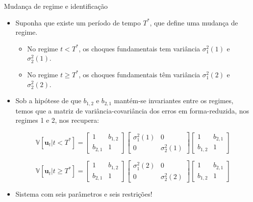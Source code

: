 \documentclass[11pt]{beamer}
\begin{document}
\begin{frame}{Mudança de regime e identificação}
	\begin{itemize}
		\item Suponha que existe um período de tempo $T^*$, que {\color{blue}define uma mudança de regime}.
		\begin{itemize}
				\item No regime $t < T^*$, os choques fundamentais tem variância $\sigma_{1}^2(1)$ e $\sigma_{2}^2(1)$.
		\item No regime $t \geq T^*$, os choques fundamentais têm variância $\sigma_{1}^2(2)$ e $\sigma_{2}^2(2)$.
		\end{itemize}
		\item Sob a hipótese de que $b_{1,2}$ e $b_{2,1}$ mantém-se {\color{blue}invariantes} entre os regimes, temos que a matriz de variância-covariância dos erros em forma-reduzida, nos regimes 1 e 2, nos recupera:
		
		$$\mathbb{V}[\boldsymbol{u}_t|t<T^*] = \begin{bmatrix}
			1 & b_{1,2} \\
			b_{2,1} & 1 
		\end{bmatrix} \begin{bmatrix}
		\sigma^2_1(1) & 0  \\ 
		0 & \sigma^2_2(1)
		\end{bmatrix}  \begin{bmatrix}
		1 & b_{2,1} \\
	 b_{1,2}  	& 1 
		\end{bmatrix} $$ 
		
			$$\mathbb{V}[\boldsymbol{u}_t|t\geq T^*] = \begin{bmatrix}
			1 & b_{1,2} \\
			b_{2,1} & 1 
		\end{bmatrix} \begin{bmatrix}
			\sigma^2_1(2) & 0  \\ 
			0 & \sigma^2_2(2)
		\end{bmatrix}  \begin{bmatrix}
			1 & b_{2,1} \\
			b_{1,2}  	& 1 
		\end{bmatrix} $$ 
			\item Sistema com seis parâmetros e seis restrições!
	\end{itemize}

\end{frame}
\end{document}
